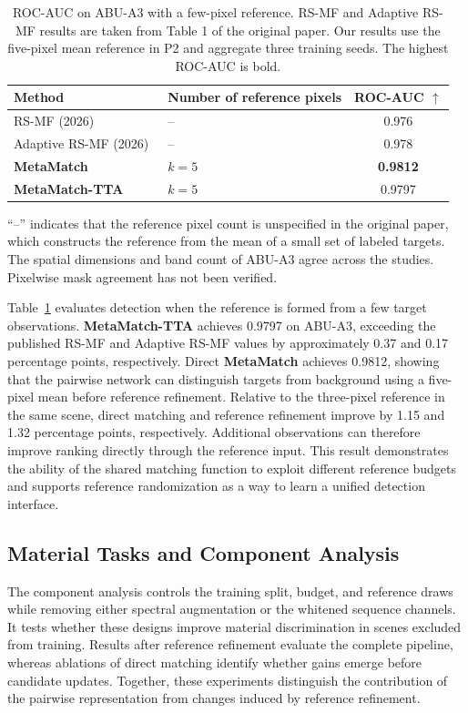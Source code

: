 \documentclass[a4paper,11pt]{article}
\newcommand{\method}{\textbf{MetaMatch-TTA}}
\newcommand{\matcher}{\textbf{MetaMatch}}
\begin{document}
\begin{table}[H]\centering\small\setlength{\tabcolsep}{10pt}
\caption{ROC-AUC on ABU-A3 with a few-pixel reference. RS-MF and Adaptive RS-MF results are taken from Table 1 of the original paper. Our results use the five-pixel mean reference in P2 and aggregate three training seeds. The highest ROC-AUC is bold.}\label{tab:selected_few}
\begin{tabular}{llc}\toprule
Method & Number of reference pixels & ROC-AUC $\uparrow$ \\ \midrule
RS-MF (2026)~\cite{rsmf2026} & -- & 0.976 \\
Adaptive RS-MF (2026)~\cite{rsmf2026} & -- & 0.978 \\
\matcher{} & $k=5$ & \textbf{0.9812} \\
\method{} & $k=5$ & 0.9797 \\
\bottomrule\end{tabular}
\par\vspace{3pt}\begin{minipage}{0.98\linewidth}\footnotesize
``--'' indicates that the reference pixel count is unspecified in the original paper, which constructs the reference from the mean of a small set of labeled targets. The spatial dimensions and band count of ABU-A3 agree across the studies. Pixelwise mask agreement has not been verified.
\end{minipage}\end{table}

Table~\ref{tab:selected_few} evaluates detection when the reference is formed from a few target observations. \method{} achieves 0.9797 on ABU-A3, exceeding the published RS-MF and Adaptive RS-MF values by approximately 0.37 and 0.17 percentage points, respectively. Direct \matcher{} achieves 0.9812, showing that the pairwise network can distinguish targets from background using a five-pixel mean before reference refinement. Relative to the three-pixel reference in the same scene, direct matching and reference refinement improve by 1.15 and 1.32 percentage points, respectively. Additional observations can therefore improve ranking directly through the reference input. This result demonstrates the ability of the shared matching function to exploit different reference budgets and supports reference randomization as a way to learn a unified detection interface.

\subsection{Material Tasks and Component Analysis}
The component analysis controls the training split, budget, and reference draws while removing either spectral augmentation or the whitened sequence channels. It tests whether these designs improve material discrimination in scenes excluded from training. Results after reference refinement evaluate the complete pipeline, whereas ablations of direct matching identify whether gains emerge before candidate updates. Together, these experiments distinguish the contribution of the pairwise representation from changes induced by reference refinement.
\end{document}
